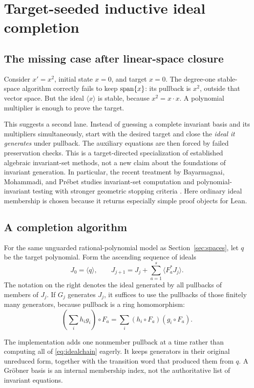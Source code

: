 \section{Target-seeded inductive ideal completion}
\label{sec:ideals}

\subsection{The missing case after linear-space closure}

Consider $x'=x^2$, initial state $x=0$, and target $x=0$. The degree-one
stable-space algorithm correctly fails to keep $\operatorname{span}\{x\}$: its pullback is
$x^2$, outside that vector space. But the ideal $\langle x\rangle$ is stable,
because $x^2=x\cdot x$. A polynomial multiplier is enough to prove the target.

This suggests a second lane. Instead of guessing a complete invariant basis and
its multipliers simultaneously, start with the desired target and close the
\emph{ideal it generates} under pullback. The auxiliary equations are then
forced by failed preservation checks. This is a target-directed specialization
of established algebraic invariant-set methods, not a new claim about the
foundations of invariant generation. In particular, the recent treatment by
Bayarmagnai, Mohammadi, and Pr\'ebet studies invariant-set computation and
polynomial-invariant testing with stronger geometric stopping criteria
\cite{bayarmagnai}. Here ordinary ideal membership is chosen because it returns
especially simple proof objects for Lean.

\subsection{A completion algorithm}

For the same unguarded rational-polynomial model as
Section~\ref{sec:spaces}, let $q$ be the target polynomial. Form the ascending
sequence of ideals
\begin{equation}\label{eq:idealchain}
 J_0=\langle q\rangle,\qquad
 J_{j+1}=J_j+\sum_{a=1}^{s}\langle F_a^*J_j\rangle.
\end{equation}
The notation on the right denotes the ideal generated by all pullbacks of
members of $J_j$. If $G_j$ generates $J_j$, it suffices to use the pullbacks of
those finitely many generators, because pullback is a ring homomorphism:
\[
 \left(\sum_i h_i g_i\right)\circ F_a
 =\sum_i (h_i\circ F_a)(g_i\circ F_a).
\]

The implementation adds one nonmember pullback at a time rather than computing
all of \eqref{eq:idealchain} eagerly. It keeps generators in their original
unreduced form, together with the transition word that produced them from $q$.
A Gr\"obner basis is an internal membership index, not the authoritative list of
invariant equations.

